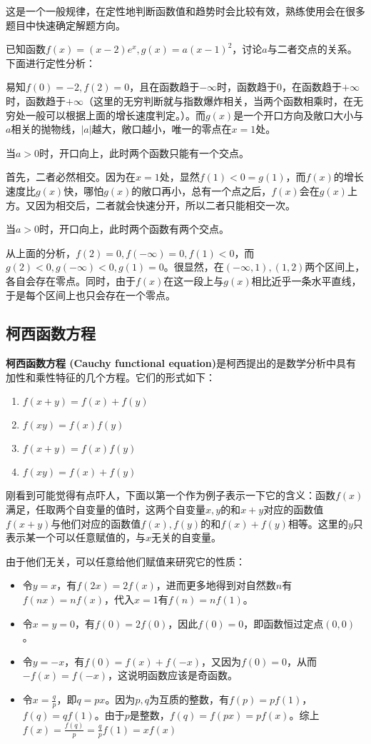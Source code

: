 这是一个一般规律，在定性地判断函数值和趋势时会比较有效，熟练使用会在很多题目中快速确定解题方向。

\begin{example}{已知函数$f(x)=(x-2)e^x,g(x)=a(x-1)^2$，讨论$a$与二者交点的关系。}
下面进行定性分析：

易知$f(0)=-2,f(2)=0$，且在函数趋于$-\infty$时，函数趋于$0$，在函数趋于$+\infty$时，函数趋于$+\infty$（这里的无穷判断就与指数爆炸相关，当两个函数相乘时，在无穷处一般可以根据上面的增长速度判定。）。而$g(x)$是一个开口方向及敞口大小与$a$相关的抛物线，$|a|$越大，敞口越小，唯一的零点在$x=1$处。

当$a>0$时，开口向上，此时两个函数只能有一个交点。

首先，二者必然相交。因为在$x=1$处，显然$f(1)<0=g(1)$，而$f(x)$的增长速度比$g(x)$快，哪怕$g(x)$的敞口再小，总有一个点之后，$f(x)$会在$g(x)$上方。又因为相交后，二者就会快速分开，所以二者只能相交一次。

当$a>0$时，开口向上，此时两个函数有两个交点。

从上面的分析，$f(2)=0,f(-\infty)=0,f(1)<0$，而$g(2)<0,g(-\infty)<0,g(1)=0$。很显然，在$(-\infty,1),(1,2)$两个区间上，各自会存在零点。同时，由于$f(x)$在这一段上与$g(x)$相比近乎一条水平直线，于是每个区间上也只会存在一个零点。

\end{example}

\subsection{柯西函数方程}

\textbf{柯西函数方程 (Cauchy functional equation)}是柯西提出的是数学分析中具有加性和乘性特征的几个方程。它们的形式如下：
\begin{enumerate}
\item $f(x+y)=f(x)+f(y)$
\item $f(xy) = f(x) f(y)$
\item $f(x+y)=f(x)f(y)$
\item $f(xy) = f(x)+f(y)$
\end{enumerate}

刚看到可能觉得有点吓人，下面以第一个作为例子表示一下它的含义：函数$f(x)$满足，任取两个自变量的值时，这两个自变量$x,y$的和$x+y$对应的函数值$f(x+y)$与他们对应的函数值$f(x),f(y)$的和$f(x)+f(y)$相等。这里的$y$只表示某一个可以任意赋值的，与$x$无关的自变量。

由于他们无关，可以任意给他们赋值来研究它的性质：
\begin{itemize}
\item 令$y=x$，有$f(2x)=2f(x)$，进而更多地得到对自然数$n$有$f(nx)=nf(x)$，代入$x=1$有$f(n)=nf(1)$。
\item 令$x=y=0$，有$f(0)=2f(0)$，因此$f(0)=0$，即函数恒过定点$(0,0)$。
\item 令$y=-x$，有$f(0)=f(x)+f(-x)$，又因为$f(0)=0$，从而$-f(x)=f(-x)$，这说明函数应该是奇函数。
\item 令$\displaystyle x=\frac{q}{p}$，即$q=px$。因为$p,q$为互质的整数，有$f(p)=pf(1)$，$f(q)=qf(1)$。由于$p$是整数，$f(q)=f(px)=pf(x)$。综上$\displaystyle f(x)=\frac{f(q)}{p}=\frac{q}{p}f(1)=xf(x)$
\end{itemize}

